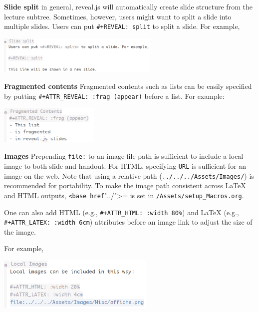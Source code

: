 \documentclass[10pt,article]{article}
\begin{document}
\textbf{Slide split} in general, reveal.js will automatically create slide structure
from the lecture subtree. Sometimes, however, users might want to split a
slide into multiple slides. Users can put \texttt{\#+REVEAL: split} to split a
slide. For example,

\begin{center}
\includegraphics[height=1.8cm]{../../../Assets/Images/Org-Teaching/Quickstart_Lecture-Editing_Split.png}
\end{center}

\textbf{Fragmented contents} Fragmented contents such as lists can be easily
specified by putting \texttt{\#+ATTR\_REVEAL: :frag (appear)} before a list. For example:

\begin{center}
\includegraphics[height=1.8cm]{../../../Assets/Images/Org-Teaching/Quickstart_Lecture-Editing_Fragmented.png}
\end{center}

\textbf{Images} Prepending \texttt{file:} to an image file path is sufficient to include a
local image to both slide and handout. For HTML, specifying \texttt{URL} is
sufficient for an image on the web. Note that using a relative path
(\texttt{../../../Assets/Images/}) is recommended for portability. To make the image
path consistent across \LaTeX{} and HTML outputs, \texttt{<base href}"../">= is set in
\texttt{/Assets/setup\_Macros.org}.

One can also add HTML (e.g., \texttt{\#+ATTR\_HTML: :width 80\%}) and \LaTeX{}
(e.g., \texttt{\#+ATTR\_LATEX: :width 6cm}) attributes before an image link to adjust the
size of the image.

For example,

\begin{center}
\includegraphics[height=2.5cm]{../../../Assets/Images/Org-Teaching/Quickstart_Lecture-Editing_Images.png}
\end{center}
\end{document}
